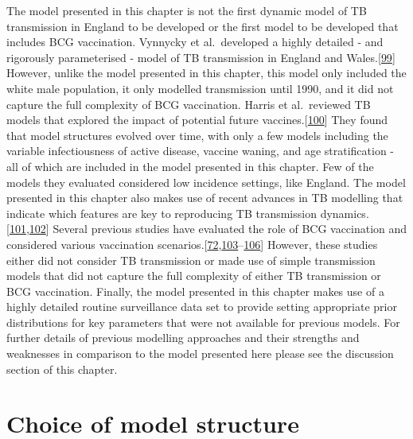 \documentclass[11pt,twoside]{bristolthesis}
\begin{document}
  The model presented in this chapter is not the first dynamic model of TB transmission in England to be developed or the first model to be developed that includes BCG vaccination. Vynnycky et al.~developed a highly detailed - and rigorously parameterised - model of TB transmission in England and Wales.{[}\protect\hyperlink{ref-Vynnycky1997a}{99}{]} However, unlike the model presented in this chapter, this model only included the white male population, it only modelled transmission until 1990, and it did not capture the full complexity of BCG vaccination. Harris et al.~reviewed TB models that explored the impact of potential future vaccines.{[}\protect\hyperlink{ref-Harris2016}{100}{]} They found that model structures evolved over time, with only a few models including the variable infectiousness of active disease, vaccine waning, and age stratification - all of which are included in the model presented in this chapter. Few of the models they evaluated considered low incidence settings, like England. The model presented in this chapter also makes use of recent advances in TB modelling that indicate which features are key to reproducing TB transmission dynamics.{[}\protect\hyperlink{ref-Ragonnet2017}{101},\protect\hyperlink{ref-Brooks-Pollock2010}{102}{]} Several previous studies have evaluated the role of BCG vaccination and considered various vaccination scenarios.{[}\protect\hyperlink{ref-Usher2016}{72},\protect\hyperlink{ref-Manissero2008a}{103}--\protect\hyperlink{ref-Bhunu2008b}{106}{]} However, these studies either did not consider TB transmission or made use of simple transmission models that did not capture the full complexity of either TB transmission or BCG vaccination. Finally, the model presented in this chapter makes use of a highly detailed routine surveillance data set to provide setting appropriate prior distributions for key parameters that were not available for previous models. For further details of previous modelling approaches and their strengths and weaknesses in comparison to the model presented here please see the discussion section of this chapter.
  
  \hypertarget{model-just}{%
  \section{Choice of model structure}\label{model-just}}
  
\end{document}
